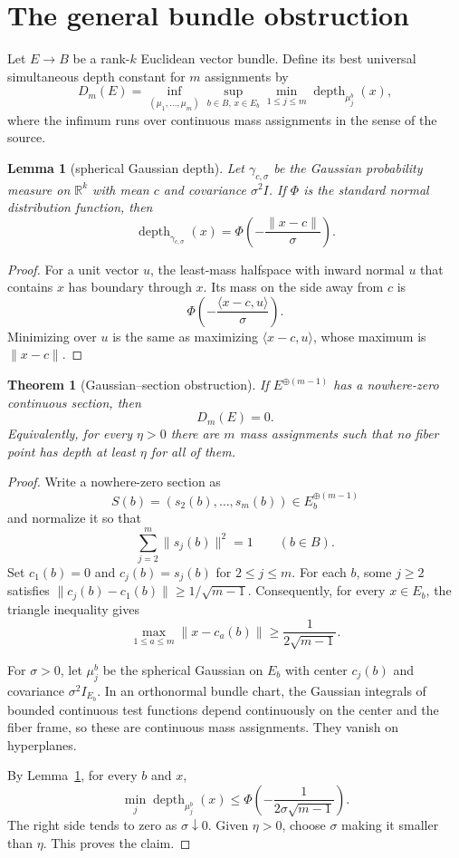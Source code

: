 \documentclass[11pt]{article}
\newtheorem{theorem}{Theorem}
\newtheorem{lemma}{Lemma}
\newcommand{\R}{\mathbb R}
\newcommand{\depth}{\operatorname{depth}}
\begin{document}
\section{The general bundle obstruction}

Let $E\to B$ be a rank-$k$ Euclidean vector bundle.  Define its best universal
simultaneous depth constant for $m$ assignments by
\[
 D_m(E)=\inf_{(\mu_1,\ldots,\mu_m)}
 \sup_{b\in B,\,x\in E_b}\min_{1\leq j\leq m}
 \depth_{\mu_j^b}(x),
\]
where the infimum runs over continuous mass assignments in the sense of the
source.

\begin{lemma}[spherical Gaussian depth]\label{lem:gauss}
Let $\gamma_{c,\sigma}$ be the Gaussian probability measure on $\R^k$ with
mean $c$ and covariance $\sigma^2I$.  If $\Phi$ is the standard normal
distribution function, then
\[
 \depth_{\gamma_{c,\sigma}}(x)
 =\Phi\!\left(-\frac{\lVert x-c\rVert}{\sigma}\right).
\]
\end{lemma}

\begin{proof}
For a unit vector $u$, the least-mass halfspace with inward normal $u$ that
contains $x$ has boundary through $x$.  Its mass on the side away from $c$ is
\[
 \Phi\!\left(-\frac{\langle x-c,u\rangle}{\sigma}\right).
\]
Minimizing over $u$ is the same as maximizing
$\langle x-c,u\rangle$, whose maximum is $\lVert x-c\rVert$.
\end{proof}

\begin{theorem}[Gaussian--section obstruction]\label{thm:general}
If $E^{\oplus(m-1)}$ has a nowhere-zero continuous section, then
\[
 D_m(E)=0.
\]
Equivalently, for every $\eta>0$ there are $m$ mass assignments such that no
fiber point has depth at least $\eta$ for all of them.
\end{theorem}

\begin{proof}
Write a nowhere-zero section as
\[
 S(b)=(s_2(b),\ldots,s_m(b))\in E_b^{\oplus(m-1)}
\]
and normalize it so that
\[
 \sum_{j=2}^m\lVert s_j(b)\rVert^2=1
 \qquad(b\in B).
\]
Set $c_1(b)=0$ and $c_j(b)=s_j(b)$ for $2\leq j\leq m$.  For each $b$, some
$j\geq2$ satisfies
$\lVert c_j(b)-c_1(b)\rVert\geq1/\sqrt{m-1}$.
Consequently, for every $x\in E_b$, the triangle inequality gives
\[
 \max_{1\leq a\leq m}\lVert x-c_a(b)\rVert
 \geq \frac{1}{2\sqrt{m-1}}.
\]

For $\sigma>0$, let $\mu_j^b$ be the spherical Gaussian on $E_b$ with center
$c_j(b)$ and covariance $\sigma^2I_{E_b}$.  In an orthonormal bundle chart,
the Gaussian integrals of bounded continuous test functions depend
continuously on the center and the fiber frame, so these are continuous mass
assignments.  They vanish on hyperplanes.

By Lemma~\ref{lem:gauss}, for every $b$ and $x$,
\[
 \min_j\depth_{\mu_j^b}(x)
 \leq
 \Phi\!\left(-\frac{1}{2\sigma\sqrt{m-1}}\right).
\]
The right side tends to zero as $\sigma\downarrow0$.  Given $\eta>0$, choose
$\sigma$ making it smaller than $\eta$.  This proves the claim.
\end{proof}
\end{document}
